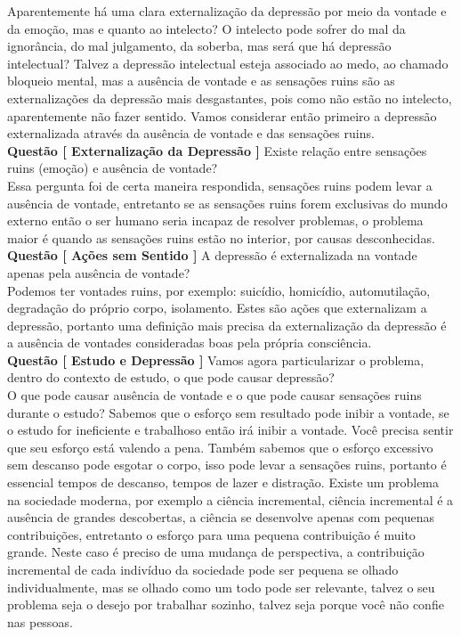 \hrulefill

Aparentemente há uma clara externalização da depressão por meio da vontade e da emoção, mas e quanto ao intelecto? O intelecto pode sofrer do mal da ignorância, do mal julgamento, da soberba, mas será que há depressão intelectual? Talvez a depressão intelectual esteja associado ao medo, ao chamado bloqueio mental, mas a ausência de vontade e as sensações ruins são as externalizações da depressão mais desgastantes, pois como não estão no intelecto, aparentemente não fazer sentido. Vamos considerar então primeiro a depressão externalizada através da ausência de vontade e das sensações ruins.\\

\textbf{Questão [ Externalização da Depressão ]} Existe relação entre sensações ruins (emoção) e ausência de vontade? \\

Essa pergunta foi de certa maneira respondida, sensações ruins podem levar a ausência de vontade, entretanto se as sensações ruins forem exclusivas do mundo externo então o ser humano seria incapaz de resolver problemas, o problema maior é quando as sensações ruins estão no interior, por causas desconhecidas.\\

\textbf{Questão [ Ações sem Sentido ]} A depressão é externalizada na vontade apenas pela ausência de vontade?\\

Podemos ter vontades ruins, por exemplo: suicídio, homicídio, automutilação, degradação do próprio corpo, isolamento. Estes são ações que externalizam a depressão, portanto uma definição mais precisa da externalização da depressão é a ausência de vontades consideradas boas pela própria consciência.\\

\textbf{Questão [ Estudo e Depressão ]} Vamos agora particularizar o problema, dentro do contexto de estudo, o que pode causar depressão?\\

O que pode causar ausência de vontade e o que pode causar sensações ruins durante o estudo? Sabemos que o esforço sem resultado pode inibir a vontade, se o estudo for ineficiente e trabalhoso então irá inibir a vontade. Você precisa sentir que seu esforço está valendo a pena. Também sabemos que o esforço excessivo sem descanso pode esgotar o corpo, isso pode levar a sensações ruins, portanto é essencial tempos de descanso, tempos de lazer e distração. Existe um problema na sociedade moderna, por exemplo a ciência incremental, ciência incremental é a ausência de grandes descobertas, a ciência se desenvolve apenas com pequenas contribuições, entretanto o esforço para uma pequena contribuição é muito grande. Neste caso é preciso de uma mudança de perspectiva, a contribuição incremental de cada indivíduo da sociedade pode ser pequena se olhado individualmente, mas se olhado como um todo pode ser relevante, talvez o seu problema seja o desejo por trabalhar sozinho, talvez seja porque você não confie nas pessoas. \\

